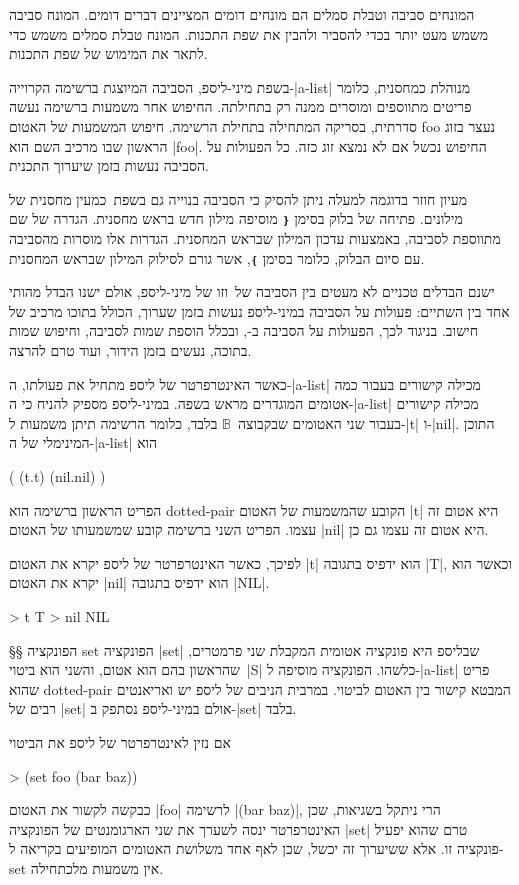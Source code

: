 המונחים סביבה וטבלת סמלים הם מונחים דומים המציינים דברים דומים. המונח סביבה
משמש מעט יותר בכדי להסביר ולהבין את שפת התכנות. המונח טבלת סמלים משמש
כדי לתאר את המימוש של שפת התכנות.

בשפת מיני-ליספ, הסביבה המיוצגת ברשימה הקרוייה-\E|a-list| מנוהלת כמחסנית, כלומר
פריטים מתווספים ומוסרים ממנה רק בתחילתה. החיפוש אחר משמעות ברשימה נעשה סדרתית,
בסריקה המתחילה בתחילת הרשימה. חיפוש המשמעות של האטום foo נעצר בזוג הראשון שבו
מרכיב השם הוא \E|foo|. החיפוש נכשל אם לא נמצא זוג כזה. כל הפעולות על הסביבה
נעשות בזמן שיערוך התכנית.

מעיון חוזר בדוגמה למעלה ניתן להסיק כי הסביבה בנוייה גם בשפת~\CPL כמעין מחסנית
של מילונים. פתיחה של בלוק בסימן \texttt{❴} מוסיפה מילון חדש בראש מחסנית.  הגדרה
של שם מתווספת לסביבה, באמצעות עדכון המילון שבראש המחסנית.  הגדרות אלו מוסרות
מהסביבה עם סיום הבלוק, כלומר בסימן \texttt{❵}, אשר גורם לסילוק המילון שבראש המחסנית.

ישנם הבדלים טכניים לא מעטים בין הסביבה של~\CPL וזו של מיני-ליספ, אולם ישנו הבדל
מהותי אחד בין השתיים: פעולות על הסביבה במיני-ליספ נעשות בזמן שערוך, הכולל בתוכו
מרכיב של חישוב. בניגוד לכך, הפעולות על הסביבה ב-\CPL, ובכלל הוספת שמות לסביבה,
וחיפוש שמות בתוכה, נעשים בזמן הידור, ועוד טרם להרצה.

כאשר האינטרפרטר של ליספ מתחיל את פעולתו, ה-\E|a-list| מכילה קישורים בעבור כמה
אטומים המוגדרים מראש בשפה. במיני-ליספ מספיק להניח כי ה-\E|a-list| מכילה קישורים
בעבור שני האטומים שבקבוצה~$𝔹$ בלבד, כלומר הרשימה תיתן משמעות ל-\E|t| ו-\E|nil|.
התוכן המינימלי של ה-\E|a-list| הוא
\begin{LISP}
(
  (t.t)
  (nil.nil)
)
\end{LISP}

הפריט הראשון ברשימה הוא dotted-pair הקובע שהמשמעות של האטום \T|t| היא אטום זה
עצמו. הפריט השני ברשימה קובע שמשמעותו של האטום \T|nil| היא אטום זה עצמו גם כן.

לפיכך, כאשר האינטרפרטר של ליספ יקרא את האטום \T|t| הוא ידפיס בתגובה \T|T|,
וכאשר הוא יקרא את האטום \T|nil| הוא ידפיס בתגובה \T|NIL|.
\begin{LISP}
> t
T
> nil
NIL
\end{LISP}

§§ הפונקציה set
הפונקציה \T|set| שבליספ היא פונקציה אטומית המקבלת שני פרמטרים, שהראשון בהם
הוא אטום, והשני הוא ביטוי~\E|S| כלשהו. הפונקציה מוסיפה ל-\E|a-list| פריט שהוא
dotted-pair המבטא קישור בין האטום לביטוי. במרבית הניבים של ליספ יש ואריאנטים
רבים של \T|set| אולם במיני-ליספ נסתפק ב-\T|set| בלבד.

אם נזין לאינטרפרטר של ליספ את הביטוי
\begin{LISP}
> (set foo (bar baz))
\end{LISP}
כבקשה לקשור את האטום \T|foo| לרשימה \T|(bar baz)|, הרי ניתקל בשגיאות, שכן
האינטרפרטר ינסה לשערך את שני הארגומנטים של הפונקציה \E|set| טרם שהוא יפעיל
פונקציה זו. אלא ששיערוך זה יכשל, שכן לאף אחד משלושת האטומים המופיעים בקריאה
ל-set אין משמעות מלכתחילה.

